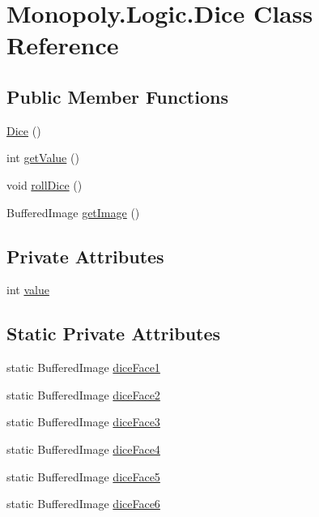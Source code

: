 \hypertarget{class_monopoly_1_1_logic_1_1_dice}{}\section{Monopoly.\+Logic.\+Dice Class Reference}
\label{class_monopoly_1_1_logic_1_1_dice}
\subsection*{Public Member Functions}
\begin{DoxyCompactItemize}
\item 
\hyperlink{class_monopoly_1_1_logic_1_1_dice_a522d482293c0d5fe5ce90e16caf8b0a8}{Dice} ()
\item 
int \hyperlink{class_monopoly_1_1_logic_1_1_dice_a9f96cca562c353e85d3c49ac78d8b27a}{get\+Value} ()
\item 
void \hyperlink{class_monopoly_1_1_logic_1_1_dice_afbc5dd2d2d59f0b84bbb760263acc8d6}{roll\+Dice} ()
\item 
Buffered\+Image \hyperlink{class_monopoly_1_1_logic_1_1_dice_a183b3e988e5a115a3ab602d7422bb4db}{get\+Image} ()
\end{DoxyCompactItemize}
\subsection*{Private Attributes}
\begin{DoxyCompactItemize}
\item 
int \hyperlink{class_monopoly_1_1_logic_1_1_dice_a2d20f27db8eb52b2ca264412dde4b566}{value}
\end{DoxyCompactItemize}
\subsection*{Static Private Attributes}
\begin{DoxyCompactItemize}
\item 
static Buffered\+Image \hyperlink{class_monopoly_1_1_logic_1_1_dice_a6f1555256858caba81a74d724ef70398}{dice\+Face1}
\item 
static Buffered\+Image \hyperlink{class_monopoly_1_1_logic_1_1_dice_a66bd90194d26dc5578795f70dcf78586}{dice\+Face2}
\item 
static Buffered\+Image \hyperlink{class_monopoly_1_1_logic_1_1_dice_ae289a3e2ef5c5aee2380146004dd830c}{dice\+Face3}
\item 
static Buffered\+Image \hyperlink{class_monopoly_1_1_logic_1_1_dice_a939c21d33009eaaee4b52fedd0e9ae08}{dice\+Face4}
\item 
static Buffered\+Image \hyperlink{class_monopoly_1_1_logic_1_1_dice_a5da3b853de577deeacdf6931bd9a45ee}{dice\+Face5}
\item 
static Buffered\+Image \hyperlink{class_monopoly_1_1_logic_1_1_dice_a0bef4589a1358dc8502014b5503bd4ee}{dice\+Face6}
\end{DoxyCompactItemize}


